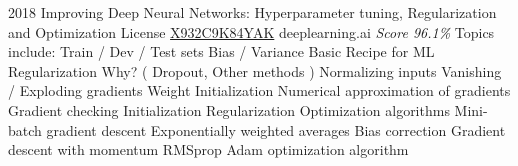 \documentclass[11pt,a4paper]{moderncv}
\begin{document}
\cventry
    {2018}
    {Improving Deep Neural Networks: Hyperparameter tuning, Regularization and Optimization}
    {License
        \href{https://www.coursera.org/account/accomplishments/records/X932C9K84YAK}
        {X932C9K84YAK}
    }
    {deeplearning.ai}
    {\textit{Score 96.1\%}}
    {
        Topics include:                                                          %
            Train / Dev / Test sets                                                          %
            Bias / Variance                                                          %
            Basic Recipe for ML                                                          %
            Regularization                                                          %
            Why? (                                                          %
                Dropout,                                                          %
                Other methods                                                          %
                )                                                          %
            Normalizing inputs                                                          %
            Vanishing / Exploding gradients                                                          %
            Weight Initialization                                                          %
            Numerical approximation of gradients                                                          %
            Gradient checking                                                          %
            Initialization                                                          %
            Regularization                                                          %
            Optimization algorithms                                                          %
            Mini-batch gradient descent                                                          %
            Exponentially weighted averages                                                          %
            Bias correction                                                          %
            Gradient descent with momentum                                                          %
            RMSprop                                                          %
            Adam optimization algorithm                                                          %
}
\end{document}
